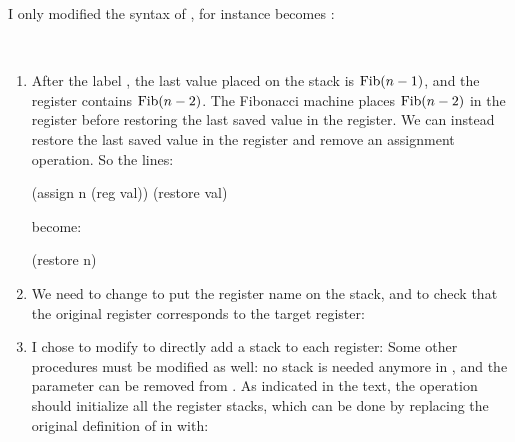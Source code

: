 \begin{exe}[5.10]
    I only modified the syntax of , for instance
     becomes
    :
\end{exe}

\begin{exe}[5.11]
    \ \vspace{-20pt}
    \begin{enumerate}
	\item After the label , the last value placed on the 
	    stack is $\operatorname{Fib}(n - 1)$, and the  register contains $\operatorname{Fib}(n 
	    - 2)$. The Fibonacci machine places $\operatorname{Fib}(n - 2)$ in the  
	    register before restoring the last saved value in the  
	    register. We can instead restore the last saved value in the 
	     register and remove an assignment operation. So the lines:
            \begin{cscm}
                (assign n (reg val))
                (restore val)
            \end{cscm}
            become:
            \begin{cscm}
                (restore n)
            \end{cscm}
	\item We need to change  to put the register name on the 
	    stack, and  to check that the original register 
	    corresponds to the target register:
	\item I chose to modify  to directly add a stack to 
	    each register:
	    Some other procedures must be modified as well: no stack is needed 
	    anymore in
	    \linebreak
	    , and the  parameter can be 
	    removed from
	    \linebreak
	    . As indicated in the text, the 
	     operation should initialize all the register 
	    stacks, which can be done by replacing the original definition of 
	     in  with:
    \end{enumerate}
\end{exe}


